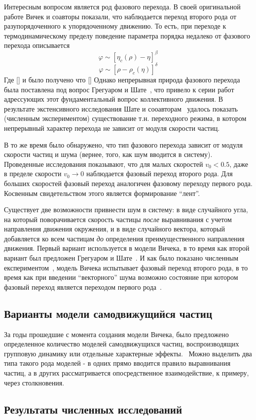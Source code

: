     Интересным вопросом является род фазового перехода. В своей оригинальной работе Вичек и соавторы показали, что наблюдается переход второго рода от разупорядоченного к упорядоченному движению. То есть, при переходе к термодинамическому пределу поведение параметра порядка недалеко от фазового перехода описывается
    \begin{equation}
        \varphi \sim [\eta_c(\rho)-\eta]^\beta
    \end{equation}
    \begin{equation}
        \varphi \sim [\rho-\rho_c(\eta)]^\delta
    \end{equation}
    Где [] и было получено что []
    Однако непрерывная природа фазового перехода была поставлена под вопрос Грегуаром и Шате~\cite{gregoire2004}, что привело к серии работ адрессующих этот фундаментальный вопрос коллективного движения. В результате экстенсивного исследования Шате и сооавторам~\cite{chate2008} удалось показать (численным экспериментом) существование т.н. переходного режима, в котором непрерывный характер перехода не зависит от модуля скорости частиц. 

    В то же время было обнаружено, что тип фазового перехода зависит от модуля скорости частиц и шума (вернее, того, как шум вводится в систему). Проведенные исследования показывают, что для малых скоростей $v_0 < 0.5$, даже в пределе скорости $v_0 \to 0$ наблюдается фазовый переход второго рода. Для больших скоростей фазовый переход аналогичен фазовому переходу первого рода. Косвенным свидетельством этого является формирование ``лент''.\cite{huepe2008}

    Существует две возможности привнести шум в систему: в виде случайного угла, на который поворачивается скорость частицы \textit{после} выравнивания с учетом направления движения окружения, и в виде случайного вектора, который добавляется ко всем частицам \textit{до} определения преимущественного направления движения. Первый вариант используется в модели Вичека, в то время как второй вариант был предложен Грегуаром и Шате~\cite{gregoire2004}. И как было показано численным експериментом~\cite{baglietto2008}, модель Вичека испытывает фазовый переход второго рода, в то время как при введении ``векторного'' шума возможно состояние при котором фазовый переход является переходом первого рода~\cite{aldana2009}.

    \subsection{Варианты модели самодвижущийся частиц} %
    \label{sub:VariantsOfVicsekModel}
    За годы прошедшие с момента создания модели Вичека, было предложено определенное количество моделей самодвижущихся частиц, воспроизводящих групповую динамику или отдельные характерные эффекты.~\cite{vicsek2012}
    Можно выделить два типа такого рода моделей - в одних прямо вводится правило выравнивания частиц, а в других рассматривается опосредственное взаимодействие, к примеру, через столкновения.

    \subsection{Результаты численных исследований} %
    \label{sub:CompModelsResults}
    

